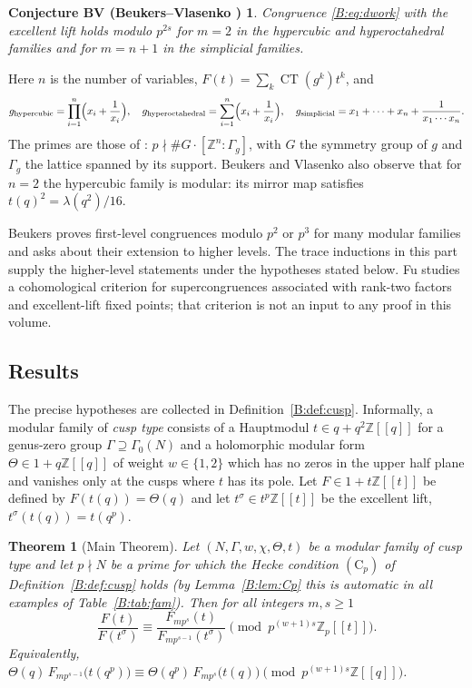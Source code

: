 \documentclass[11pt,a4paper]{article}
\newtheorem{theorem}{Theorem}[section]
\newtheorem*{bvconj}{Conjecture BV (Beukers--Vlasenko {\cite[Conj.~7.5]{BV3}})}
\theoremstyle{definition}\newtheorem{definition}[theorem]{Definition}
\theoremstyle{remark}\newtheorem{remark}[theorem]{Remark}
\newcommand{\Z}{\mathbb Z}
\DeclareMathOperator{\CT}{CT}
\numberwithin{equation}{section}
\begin{document}
\begin{bvconj}
Congruence \eqref{B:eq:dwork} with the excellent lift holds modulo $p^{2s}$ for $m=2$ in the
hypercubic and hyperoctahedral families and for $m=n+1$ in the simplicial families.
\end{bvconj}

Here $n$ is the number of variables, $F(t)=\sum_k\CT(g^k)t^k$, and
\[
g_{\rm hypercubic}=\prod_{i=1}^n\Bigl(x_i+\frac1{x_i}\Bigr),\quad
g_{\rm hyperoctahedral}=\sum_{i=1}^n\Bigl(x_i+\frac1{x_i}\Bigr),\quad
g_{\rm simplicial}=x_1+\dots+x_n+\frac1{x_1\cdots x_n}.
\]
The primes are those of \cite[Thm.~7.3]{BV3}: $p\nmid \#G\cdot[\Z^n:\Gamma_g]$, with $G$ the
symmetry group of $g$ and $\Gamma_g$ the lattice spanned by its support. Beukers and Vlasenko also
observe \cite[\S8]{BV3} that for $n=2$ the hypercubic family is modular: its mirror map satisfies
$t(q)^2=\lambda(q^2)/16$.

Beukers \cite{Beu26} proves first-level congruences modulo $p^2$ or $p^3$ for many modular families and asks about their extension to higher levels. The trace inductions in this part supply the higher-level statements under the hypotheses stated below. Fu \cite{Fu26} studies a cohomological criterion for supercongruences associated with rank-two factors and excellent-lift fixed points; that criterion is not an input to any proof in this volume.

\subsection{Results}
The precise hypotheses are collected in Definition~\ref{B:def:cusp}. Informally, a modular family of
\emph{cusp type} consists of a Hauptmodul $t\in q+q^2\Z[[q]]$ for a genus-zero group
$\Gamma\supseteq\Gamma_0(N)$ and a holomorphic modular form $\Theta\in1+q\Z[[q]]$ of weight
$w\in\{1,2\}$ which has no zeros in the upper half plane and vanishes only at the cusps where $t$ has its
pole. Let $F\in1+t\Z[[t]]$ be defined by $F(t(q))=\Theta(q)$ and let
$t^\sigma\in t^p\Z[[t]]$ be the excellent lift, $t^\sigma(t(q))=t(q^p)$.

\begin{theorem}[Main Theorem]\label{B:thm:main}
Let $(N,\Gamma,w,\chi,\Theta,t)$ be a modular family of cusp type and let $p\nmid N$ be a prime for
which the Hecke condition $(\mathrm C_p)$ of Definition~\ref{B:def:cusp} holds (by
Lemma~\ref{B:lem:Cp} this is automatic in all examples of Table~\ref{B:tab:fam}). Then for all
integers $m,s\ge1$
\[
\frac{F(t)}{F(t^\sigma)}\equiv\frac{F_{mp^s}(t)}{F_{mp^{s-1}}(t^\sigma)}\pmod{p^{(w+1)s}\Z_p[[t]]}.
\]
Equivalently,
$\Theta(q)\,F_{mp^{s-1}}\bigl(t(q^p)\bigr)\equiv\Theta(q^p)\,F_{mp^s}\bigl(t(q)\bigr)
\pmod{p^{(w+1)s}\Z[[q]]}$.
\end{theorem}
\end{document}
